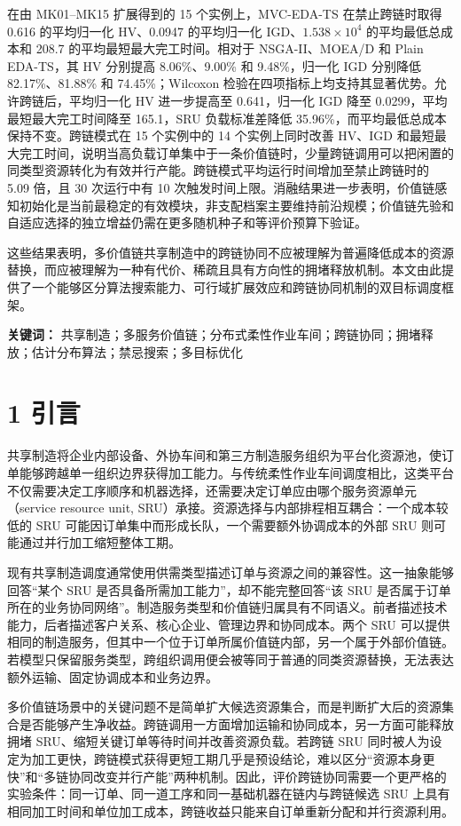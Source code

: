 \documentclass[UTF8,11pt]{ctexart}
\begin{document}
在由 MK01–MK15 扩展得到的 15 个实例上，MVC-EDA-TS 在禁止跨链时取得 0.616 的平均归一化 HV、0.0947 的平均归一化 IGD、\(1.538\times10^4\) 的平均最低总成本和 208.7 的平均最短最大完工时间。相对于 NSGA-II、MOEA/D 和 Plain EDA-TS，其 HV 分别提高 8.06\%、9.00\% 和 9.48\%，归一化 IGD 分别降低 82.17\%、81.88\% 和 74.45\%；Wilcoxon 检验在四项指标上均支持其显著优势。允许跨链后，平均归一化 HV 进一步提高至 0.641，归一化 IGD 降至 0.0299，平均最短最大完工时间降至 165.1，SRU 负载标准差降低 35.96\%，而平均最低总成本保持不变。跨链模式在 15 个实例中的 14 个实例上同时改善 HV、IGD 和最短最大完工时间，说明当高负载订单集中于一条价值链时，少量跨链调用可以把闲置的同类型资源转化为有效并行产能。跨链模式平均运行时间增加至禁止跨链时的 5.09 倍，且 30 次运行中有 10 次触发时间上限。消融结果进一步表明，价值链感知初始化是当前最稳定的有效模块，非支配档案主要维持前沿规模；价值链先验和自适应选择的独立增益仍需在更多随机种子和等评价预算下验证。

这些结果表明，多价值链共享制造中的跨链协同不应被理解为普遍降低成本的资源替换，而应被理解为一种有代价、稀疏且具有方向性的拥堵释放机制。本文由此提供了一个能够区分算法搜索能力、可行域扩展效应和跨链协同机制的双目标调度框架。

\textbf{关键词：} 共享制造；多服务价值链；分布式柔性作业车间；跨链协同；拥堵释放；估计分布算法；禁忌搜索；多目标优化

\section*{1 引言}

共享制造将企业内部设备、外协车间和第三方制造服务组织为平台化资源池，使订单能够跨越单一组织边界获得加工能力。与传统柔性作业车间调度相比，这类平台不仅需要决定工序顺序和机器选择，还需要决定订单应由哪个服务资源单元（service resource unit, SRU）承接。资源选择与内部排程相互耦合：一个成本较低的 SRU 可能因订单集中而形成长队，一个需要额外协调成本的外部 SRU 则可能通过并行加工缩短整体工期。

现有共享制造调度通常使用供需类型描述订单与资源之间的兼容性。这一抽象能够回答“某个 SRU 是否具备所需加工能力”，却不能完整回答“该 SRU 是否属于订单所在的业务协同网络”。制造服务类型和价值链归属具有不同语义。前者描述技术能力，后者描述客户关系、核心企业、管理边界和协同成本。两个 SRU 可以提供相同的制造服务，但其中一个位于订单所属价值链内部，另一个属于外部价值链。若模型只保留服务类型，跨组织调用便会被等同于普通的同类资源替换，无法表达额外运输、固定协调成本和业务边界。

多价值链场景中的关键问题不是简单扩大候选资源集合，而是判断扩大后的资源集合是否能够产生净收益。跨链调用一方面增加运输和协同成本，另一方面可能释放拥堵 SRU、缩短关键订单等待时间并改善资源负载。若跨链 SRU 同时被人为设定为加工更快，跨链模式获得更短工期几乎是预设结论，难以区分“资源本身更快”和“多链协同改变并行产能”两种机制。因此，评价跨链协同需要一个更严格的实验条件：同一订单、同一道工序和同一基础机器在链内与跨链候选 SRU 上具有相同加工时间和单位加工成本，跨链收益只能来自订单重新分配和并行资源利用。
\end{document}
